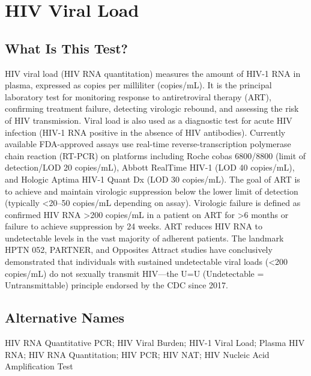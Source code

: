 \chapter{HIV Viral Load}

\section*{What Is This Test?}
HIV viral load (HIV RNA quantitation) measures the amount of HIV-1 RNA in plasma, expressed as copies per milliliter (copies/mL). It is the principal laboratory test for monitoring response to antiretroviral therapy (ART), confirming treatment failure, detecting virologic rebound, and assessing the risk of HIV transmission. Viral load is also used as a diagnostic test for acute HIV infection (HIV-1 RNA positive in the absence of HIV antibodies). Currently available FDA-approved assays use real-time reverse-transcription polymerase chain reaction (RT-PCR) on platforms including Roche cobas 6800/8800 (limit of detection/LOD 20 copies/mL), Abbott RealTime HIV-1 (LOD 40 copies/mL), and Hologic Aptima HIV-1 Quant Dx (LOD 30 copies/mL). The goal of ART is to achieve and maintain virologic suppression below the lower limit of detection (typically <20--50 copies/mL depending on assay). Virologic failure is defined as confirmed HIV RNA >200 copies/mL in a patient on ART for >6 months or failure to achieve suppression by 24 weeks. ART reduces HIV RNA to undetectable levels in the vast majority of adherent patients. The landmark HPTN 052, PARTNER, and Opposites Attract studies have conclusively demonstrated that individuals with sustained undetectable viral loads (<200 copies/mL) do not sexually transmit HIV---the U=U (Undetectable = Untransmittable) principle endorsed by the CDC since 2017.

\section*{Alternative Names}
HIV RNA Quantitative PCR; HIV Viral Burden; HIV-1 Viral Load; Plasma HIV RNA; HIV RNA Quantitation; HIV PCR; HIV NAT; HIV Nucleic Acid Amplification Test

